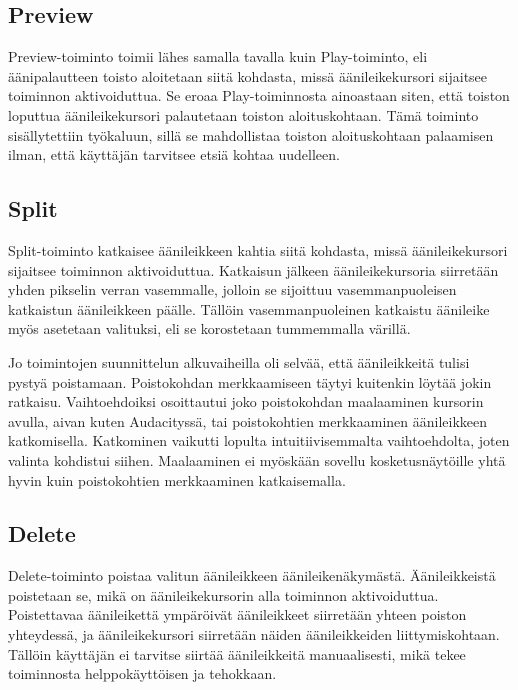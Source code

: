 \documentclass[utf8]{gradu3}
\begin{document}
\subsection{Preview}

Preview-toiminto toimii lähes samalla tavalla kuin Play-toiminto, eli äänipalautteen toisto aloitetaan siitä kohdasta, missä äänileikekursori sijaitsee toiminnon aktivoiduttua. Se eroaa Play-toiminnosta ainoastaan siten, että toiston loputtua äänileikekursori palautetaan toiston aloituskohtaan. Tämä toiminto sisällytettiin työkaluun, sillä se mahdollistaa toiston aloituskohtaan palaamisen ilman, että käyttäjän tarvitsee etsiä kohtaa uudelleen.

\subsection{Split}

Split-toiminto katkaisee äänileikkeen kahtia siitä kohdasta, missä äänileikekursori sijaitsee toiminnon aktivoiduttua. Katkaisun jälkeen äänileikekursoria siirretään yhden pikselin verran vasemmalle, jolloin se sijoittuu vasemmanpuoleisen katkaistun äänileikkeen päälle. Tällöin vasemmanpuoleinen katkaistu äänileike myös asetetaan valituksi, eli se korostetaan tummemmalla värillä.

Jo toimintojen suunnittelun alkuvaiheilla oli selvää, että äänileikkeitä tulisi pystyä poistamaan. Poistokohdan merkkaamiseen täytyi kuitenkin löytää jokin ratkaisu. Vaihtoehdoiksi osoittautui joko poistokohdan maalaaminen kursorin avulla, aivan kuten Audacityssä, tai poistokohtien merkkaaminen äänileikkeen katkomisella. Katkominen vaikutti lopulta intuitiivisemmalta vaihtoehdolta, joten valinta kohdistui siihen. Maalaaminen ei myöskään sovellu kosketusnäytöille yhtä hyvin kuin poistokohtien merkkaaminen katkaisemalla.

\subsection{Delete}

Delete-toiminto poistaa valitun äänileikkeen äänileikenäkymästä. Äänileikkeistä poistetaan se, mikä on äänileikekursorin alla toiminnon aktivoiduttua. Poistettavaa äänileikettä ympäröivät äänileikkeet siirretään yhteen poiston yhteydessä, ja äänileikekursori siirretään näiden äänileikkeiden liittymiskohtaan. Tällöin käyttäjän ei tarvitse siirtää äänileikkeitä manuaalisesti, mikä tekee toiminnosta helppokäyttöisen ja tehokkaan.
\end{document}

